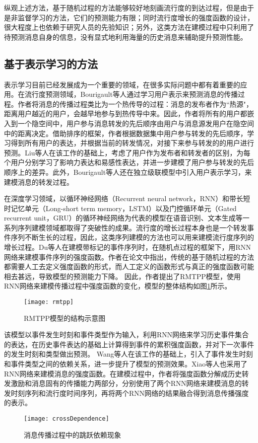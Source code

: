 纵观上述方法，基于随机过程的方法能够较好地刻画流行度的到达过程，但是由于是非监督学习的方法，它们的预测能力有限；同时流行度增长的强度函数的设计，很大程度上也依赖于研究人员的先验知识；另外，这类方法在建模过程中只利用了待预测消息自身的信息，没有显式地利用海量的历史消息来辅助提升预测性能。

\subsection{基于表示学习的方法}
表示学习目前已经发展成为一个重要的领域，在很多实际问题中都有着重要的应用。在流行度预测领域，Bourigault等人\citep{bourigault2014learning}通过学习用户表示来预测消息的传播过程。作者将消息的传播过程类比为一个热传导的过程：消息的发布者作为``热源"，距离用户越近的用户，会越早地参与到热传导中来。因此，作者将所有的用户都嵌入到一个隐空间中，用户参与消息转发的先后顺序由用户与消息源发用户在隐空间中的距离决定。借助排序的框架，作者根据数据集中用户参与转发的先后顺序，学习得到所有用户的表达，并根据当前的转发情况，对接下来参与转发的的用户进行预测。Liu等人\citep{liu2016learning}在该工作的基础上，考虑了用户作为发布者和转发者的区别，为每个用户分别学习了影响力表达和易感性表达，并进一步建模了用户参与转发的先后顺序上的差异。此外，Bourigault等人\citep{bourigault2016representation}还在独立级联模型\citep{goldenberg2001talk}中引入用户表示学习，来建模消息的转发过程。

在深度学习领域，以循环神经网络（Recurrent neural network，RNN）\citep{mikolov2010recurrent}和带长短时记忆单元（Long-short term memory，LSTM）\citep{hochreiter1997long}以及门控循环单元（Gated recurrent unit，GRU）\citep{cho2014learning}的循环神经网络为代表的模型在语音识别、文本生成等一系列序列建模领域都取得了突破性的成果。流行度的增长过程本身也是一个转发事件序列不断生长的过程，因此，这类序列建模的方法也可以用来建模流行度序列的增长过程。Du等人\citep{du2016recurrent}在建模带标记的事件序列时，在随机点过程的框架下，用RNN网络来建模事件序列的强度函数。作者在论文中指出，传统的基于随机过程的方法都需要人工去定义强度函数的形式，而人工定义的函数形式与真正的强度函数可能相去甚远，导致模型的预测能力下降。
因此，作者提出了RMTPP模型，使用RNN网络来建模传播过程中强度函数的变化，模型的整体结构如图\ref{fig:rmtpp}所示。
\begin{figure}[!htbp]
  \centering
  \texttt{[image: rmtpp]}
  \caption{RMTPP模型的结构示意图\citep{du2016recurrent}}
  \label{fig:rmtpp}
\end{figure}
该模型以事件发生时刻和事件类型作为输入，利用RNN网络来学习历史事件集合的表达，在历史事件表达的基础上计算得到事件的累积强度函数，并对下一次事件的发生时刻和类型做出预测。
Wang等人\citep{wang2017marked}在该工作的基础上，引入了事件发生时刻和事件类型之间的依赖关系，进一步提升了模型的预测效果。Xiao等人\citep{xiao2017modeling}也采用了RNN网络来建模消息的强度函数。在建模过程中，作者将强度函数分解成历史转发激励和消息固有的传播能力两部分，分别使用了两个RNN网络来建模消息的转发时刻序列和流行度时间序列，再将两个RNN网络的结果融合得到消息传播强度的表示。
\begin{figure}[!htbp]
  \centering
  \texttt{[image: crossDependence]}
  \caption{消息传播过程中的跳跃依赖现象\citep{wang2017cascade}}
  \label{fig:crossDependence}
\end{figure}

